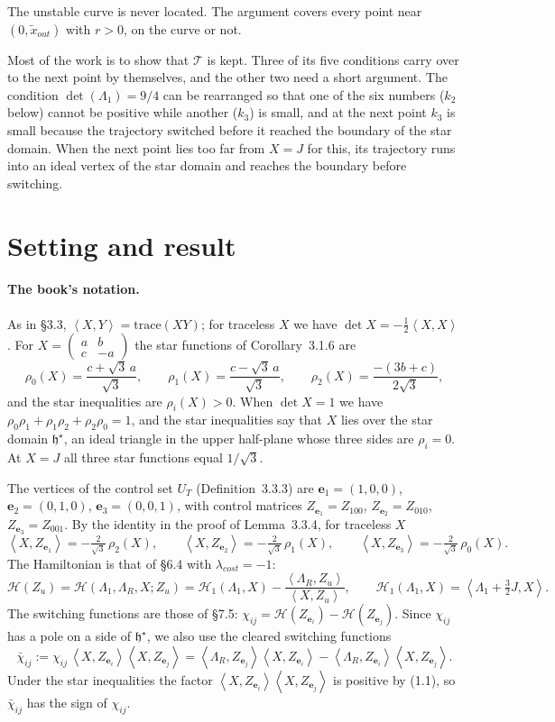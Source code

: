 \documentclass[11pt,a4paper]{article}
\theoremstyle{plain}
\theoremstyle{definition}
\theoremstyle{remark}
\newcommand{\bracks}[2]{\left\langle #1,#2\right\rangle}
\newcommand{\hstar}{\mathfrak{h}^{\star}}
\renewcommand{\H}{\mathcal{H}}
\newcommand{\ep}{\mathbf{e}}
\newcommand{\tr}{\mathrm{trace}}
\newcommand{\T}{\mathcal{T}}
\newcommand{\cl}{\bar\chi}
\begin{document}
The unstable curve is never located. The argument covers every point near $(0,\tilde x_{out})$
with $r>0$, on the curve or not.

Most of the work is to show that $\T$ is kept. Three of its five conditions carry over to the
next point by themselves, and the other two need a short argument. The condition
$\det(\Lambda_1)=9/4$ can be rearranged so that one of the six numbers ($k_2$ below) cannot be
positive while another ($k_3$) is small, and at the next point $k_3$ is small because the
trajectory switched before it reached the boundary of the star domain. When the next point lies
too far from $X=J$ for this, its trajectory runs into an ideal vertex of the star domain and
reaches the boundary before switching.

\section{Setting and result}

\paragraph{The book's notation.} As in \S3.3, $\bracks XY=\tr(XY)$; for traceless $X$ we have
$\det X=-\frac12\bracks XX$. For $X=\left(\begin{smallmatrix}a&b\\c&-a\end{smallmatrix}\right)$ the
star functions of Corollary~3.1.6 are
\[
\rho_0(X)=\frac{c+\sqrt3\,a}{\sqrt3},\qquad\rho_1(X)=\frac{c-\sqrt3\,a}{\sqrt3},\qquad
\rho_2(X)=\frac{-(3b+c)}{2\sqrt3},
\]
and the star inequalities are $\rho_i(X)>0$. When $\det X=1$ we have
$\rho_0\rho_1+\rho_1\rho_2+\rho_2\rho_0=1$, and the star inequalities say that $X$ lies over the
star domain $\hstar$, an ideal triangle in the upper half-plane whose three sides are
$\rho_i=0$. At $X=J$ all three star functions equal $1/\sqrt3$.

The vertices of the control set $U_T$ (Definition~3.3.3) are $\ep_1=(1,0,0)$, $\ep_2=(0,1,0)$,
$\ep_3=(0,0,1)$, with control matrices $Z_{\ep_1}=Z_{100}$, $Z_{\ep_2}=Z_{010}$,
$Z_{\ep_3}=Z_{001}$. By the identity in the proof of Lemma~3.3.4, for traceless $X$
\begin{equation}\tag{1.1}
\bracks X{Z_{\ep_1}}=-\tfrac{2}{\sqrt3}\,\rho_2(X),\qquad
\bracks X{Z_{\ep_2}}=-\tfrac{2}{\sqrt3}\,\rho_1(X),\qquad
\bracks X{Z_{\ep_3}}=-\tfrac{2}{\sqrt3}\,\rho_0(X) .
\end{equation}
The Hamiltonian is that of \S6.4 with $\lambda_{cost}=-1$:
\[
\H(Z_u)=\H(\Lambda_1,\Lambda_R,X;Z_u)=\H_1(\Lambda_1,X)-\frac{\bracks{\Lambda_R}{Z_u}}{\bracks X{Z_u}},
\qquad \H_1(\Lambda_1,X)=\bracks{\Lambda_1+\tfrac32J}{X}.
\]
The switching functions are those of \S7.5: $\chi_{ij}=\H(Z_{\ep_i})-\H(Z_{\ep_j})$. Since
$\chi_{ij}$ has a pole on a side of $\hstar$, we also use the cleared switching functions
\[
\cl_{ij}:=\chi_{ij}\,\bracks X{Z_{\ep_i}}\bracks X{Z_{\ep_j}}
=\bracks{\Lambda_R}{Z_{\ep_j}}\bracks X{Z_{\ep_i}}-\bracks{\Lambda_R}{Z_{\ep_i}}\bracks X{Z_{\ep_j}} .
\]
Under the star inequalities the factor $\bracks X{Z_{\ep_i}}\bracks X{Z_{\ep_j}}$ is positive by
(1.1), so $\cl_{ij}$ has the sign of $\chi_{ij}$.
\end{document}
